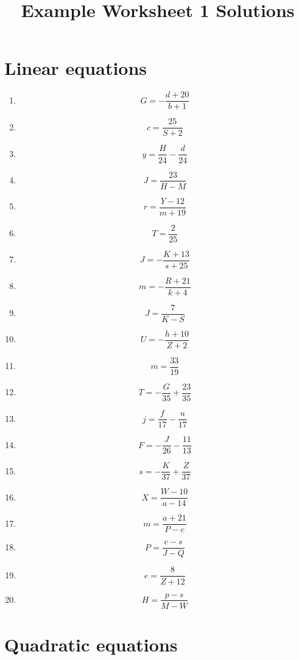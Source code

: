 \documentclass{article}
\begin{document}
    \title{Example Worksheet 1 Solutions} 
 \date{\vspace{-5ex}} 
 \maketitle

        \section{Linear equations}
        
        \begin{enumerate}
        \item$$G =- \frac{d + 20}{b + 1}$$
\item$$c =\frac{25}{S + 2}$$
\item$$y =\frac{H}{24} - \frac{d}{24}$$
\item$$J =\frac{23}{H - M}$$
\item$$r =\frac{Y - 12}{m + 19}$$
\item$$T =\frac{2}{25}$$
\item$$J =- \frac{K + 13}{s + 25}$$
\item$$m =- \frac{R + 21}{k + 4}$$
\item$$J =\frac{7}{K - S}$$
\item$$U =- \frac{h + 10}{Z + 2}$$
\item$$m =\frac{33}{19}$$
\item$$T =- \frac{G}{35} + \frac{23}{35}$$
\item$$j =\frac{f}{17} - \frac{u}{17}$$
\item$$F =- \frac{J}{26} - \frac{11}{13}$$
\item$$s =- \frac{K}{37} + \frac{Z}{37}$$
\item$$X =\frac{W - 10}{a - 14}$$
\item$$m =\frac{a + 21}{P - c}$$
\item$$P =\frac{c - s}{J - Q}$$
\item$$e =\frac{8}{Z + 12}$$
\item$$H =\frac{p - s}{M - W}$$
        \end{enumerate}
        

        \section{Quadratic equations}
        
\end{document}
